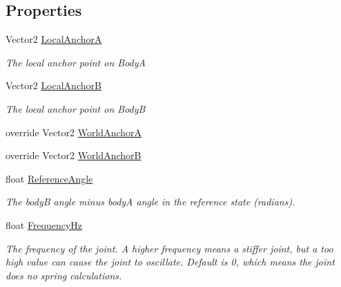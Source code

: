 \subsection*{Properties}
\begin{DoxyCompactItemize}
\item 
Vector2 \hyperlink{class_farseer_physics_1_1_dynamics_1_1_joints_1_1_weld_joint_ae3d75d438fe741faee232734de8fa855}{Local\+Anchor\+A}
\begin{DoxyCompactList}\small\item\em The local anchor point on Body\+A \end{DoxyCompactList}\item 
Vector2 \hyperlink{class_farseer_physics_1_1_dynamics_1_1_joints_1_1_weld_joint_af93bf97a631774ec061477429a0f957b}{Local\+Anchor\+B}
\begin{DoxyCompactList}\small\item\em The local anchor point on Body\+B \end{DoxyCompactList}\item 
override Vector2 \hyperlink{class_farseer_physics_1_1_dynamics_1_1_joints_1_1_weld_joint_a2d66bcb8d00e09db224b64fa09644761}{World\+Anchor\+A}
\item 
override Vector2 \hyperlink{class_farseer_physics_1_1_dynamics_1_1_joints_1_1_weld_joint_abe87f95300c07e6d849bd377a5c2ce16}{World\+Anchor\+B}
\item 
float \hyperlink{class_farseer_physics_1_1_dynamics_1_1_joints_1_1_weld_joint_a1e3169f9106c4bc0cc2f95e8bdb7954f}{Reference\+Angle}
\begin{DoxyCompactList}\small\item\em The body\+B angle minus body\+A angle in the reference state (radians). \end{DoxyCompactList}\item 
float \hyperlink{class_farseer_physics_1_1_dynamics_1_1_joints_1_1_weld_joint_ae9865abaa5f0d5578dfa0be8f9f00b09}{Frequency\+Hz}
\begin{DoxyCompactList}\small\item\em The frequency of the joint. A higher frequency means a stiffer joint, but a too high value can cause the joint to oscillate. Default is 0, which means the joint does no spring calculations. \end{DoxyCompactList}\item 

\end{DoxyCompactItemize}
